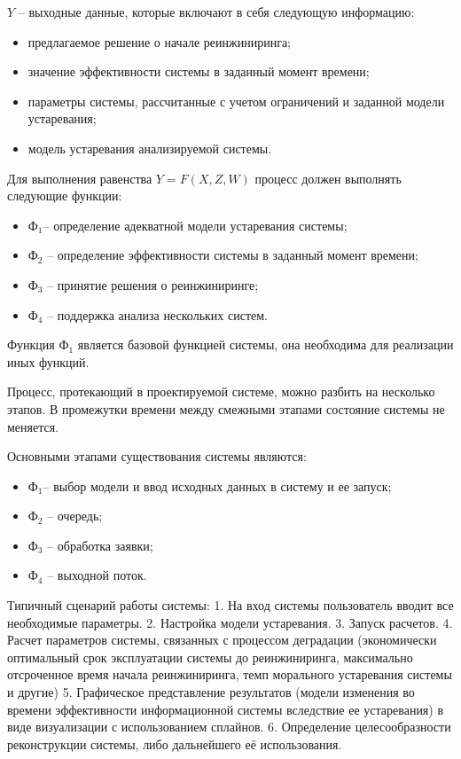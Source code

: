 $Y$ – выходные данные, которые включают в себя следующую информацию:
\begin{itemize}
    \item предлагаемое решение о начале реинжиниринга;
    \item значение эффективности системы в заданный момент времени;
    \item параметры системы, рассчитанные с учетом ограничений и заданной модели устаревания;
    \item модель устаревания анализируемой системы.
\end{itemize}
	
Для выполнения равенства $Y=F(X,Z,W)$  процесс должен выполнять следующие функции:
\begin{itemize}
    \item $Ф_1$– определение адекватной модели устаревания системы;
    \item $Ф_2$ – определение эффективности системы в заданный момент времени;
    \item $Ф_3$ – принятие решения о реинжиниринге;
    \item $Ф_4$ – поддержка анализа нескольких систем.
\end{itemize}

Функция $Ф_1$ является базовой функцией системы, она необходима для реализации иных функций.

Процесс, протекающий в проектируемой системе, можно разбить на несколько этапов. В промежутки времени между смежными этапами состояние системы не меняется. 

Основными этапами существования системы являются:
\begin{itemize}
    \item $Ф_1$– выбор модели и ввод исходных данных в систему и ее запуск; 
    \item $Ф_2$ – очередь;
    \item $Ф_3$ – обработка заявки;
    \item $Ф_4$ – выходной поток.
\end{itemize}
	 
Типичный сценарий работы системы: 
1.	На вход системы пользователь вводит все необходимые параметры.
2.	Настройка модели устаревания. 
3.	Запуск расчетов. 
4.	Расчет параметров системы, связанных с процессом деградации (экономически оптимальный срок эксплуатации системы до реинжиниринга, максимально отсроченное время начала реинжиниринга, темп морального устаревания системы и другие)
5.	Графическое представление результатов (модели изменения во времени эффективности информационной системы вследствие ее устаревания) в виде визуализации с использованием сплайнов.
6.	Определение целесообразности реконструкции системы, либо дальнейшего её использования. 


